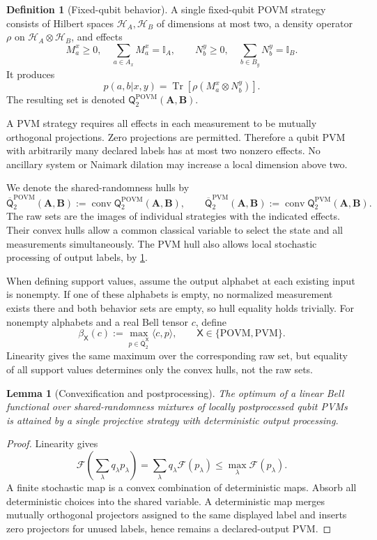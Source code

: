 \documentclass[11pt]{article}
\newtheorem{lemma}[theorem]{Lemma}
\theoremstyle{definition}
\newtheorem{definition}[theorem]{Definition}
\newcommand{\Tr}{\operatorname{Tr}}
\newcommand{\conv}{\operatorname{conv}}
\newcommand{\id}{\mathbb I}
\newcommand{\Qset}{\mathsf Q}
\newcommand{\Qbar}{\overline{\mathsf Q}}
\newcommand{\POVM}{\mathrm{POVM}}
\newcommand{\PVM}{\mathrm{PVM}}
\begin{document}
\begin{definition}[Fixed-qubit behavior]
A single fixed-qubit POVM strategy consists of Hilbert spaces
\(\mathcal H_A,\mathcal H_B\) of dimensions at most two, a density operator
\(\rho\) on \(\mathcal H_A\otimes\mathcal H_B\), and effects
\[
 M^x_a\ge0,\quad \sum_{a\in A_x}M^x_a=\id_A,\qquad
 N^y_b\ge0,\quad \sum_{b\in B_y}N^y_b=\id_B.
\]
It produces
\[
 p(a,b|x,y)=\Tr\!\left[\rho(M^x_a\otimes N^y_b)\right].
\]
The resulting set is denoted
\(\Qset^{\POVM}_2(\mathbf A,\mathbf B)\).
\end{definition}

A PVM strategy requires all effects in each measurement to be mutually
orthogonal projections. Zero projections are permitted. Therefore a
qubit PVM with arbitrarily many declared labels has at most two nonzero
effects. No ancillary system or Naimark dilation may increase a local
dimension above two.

We denote the shared-randomness hulls by
\[
\Qbar^{\POVM}_2(\mathbf A,\mathbf B)
 :=\conv\Qset^{\POVM}_2(\mathbf A,\mathbf B),\qquad
\Qbar^{\PVM}_2(\mathbf A,\mathbf B)
 :=\conv\Qset^{\PVM}_2(\mathbf A,\mathbf B).
\]
The raw sets are the images of individual strategies with the indicated
effects. Their convex hulls allow a common classical variable to select the
state and all measurements simultaneously. The PVM hull also allows local
stochastic processing of output labels, by \cref{lem:convexification}.

When defining support values, assume the output alphabet at each existing
input is nonempty. If one of these alphabets is empty, no normalized
measurement exists there and both behavior sets are empty, so hull equality
holds trivially. For nonempty alphabets and a real Bell tensor \(c\), define
\[
\beta_{\mathsf X}(c)
:=\max_{p\in\Qbar^{\mathsf X}_2}\langle c,p\rangle,
\qquad \mathsf X\in\{\POVM,\PVM\}.
\]
Linearity gives the same maximum over the corresponding raw set, but equality
of all support values determines only the convex hulls, not the raw sets.

\begin{lemma}[Convexification and postprocessing]
\label{lem:convexification}
The optimum of a linear Bell functional over shared-randomness mixtures
of locally postprocessed qubit PVMs is attained by a single projective
strategy with deterministic output processing.
\end{lemma}

\begin{proof}
Linearity gives
\[
\mathcal F\!\left(\sum_\lambda q_\lambda p_\lambda\right)
=\sum_\lambda q_\lambda\mathcal F(p_\lambda)
\le\max_\lambda\mathcal F(p_\lambda).
\]
A finite stochastic map is a convex combination of deterministic maps.
Absorb all deterministic choices into the shared variable. A deterministic
map merges mutually orthogonal projectors assigned to the same displayed
label and inserts zero projectors for unused labels, hence remains a
declared-output PVM.
\end{proof}
\end{document}
